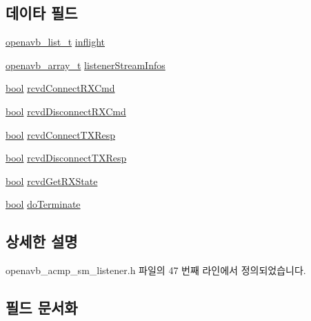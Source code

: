 \subsection*{데이타 필드}
\begin{DoxyCompactItemize}
\item 
\hyperlink{openavb__list_8h_a4bebe3a638fd3dc94da5912774a18cfe}{openavb\+\_\+list\+\_\+t} \hyperlink{structopenavb__acmp__sm__listener__vars__t_a8757a9f120141662b8b4c8b44c502c3c}{inflight}
\item 
\hyperlink{openavb__array_8h_a43e0de981c90a3d7c9ddeb67fbf2a54e}{openavb\+\_\+array\+\_\+t} \hyperlink{structopenavb__acmp__sm__listener__vars__t_ad24c4bf9e1e8f12f704194899b9555b0}{listener\+Stream\+Infos}
\item 
\hyperlink{avb__gptp_8h_af6a258d8f3ee5206d682d799316314b1}{bool} \hyperlink{structopenavb__acmp__sm__listener__vars__t_af9d28606e8d8a675efcd7519ada1a356}{rcvd\+Connect\+R\+X\+Cmd}
\item 
\hyperlink{avb__gptp_8h_af6a258d8f3ee5206d682d799316314b1}{bool} \hyperlink{structopenavb__acmp__sm__listener__vars__t_a6e45c0c8c9f8e23414d448e4c1432670}{rcvd\+Disconnect\+R\+X\+Cmd}
\item 
\hyperlink{avb__gptp_8h_af6a258d8f3ee5206d682d799316314b1}{bool} \hyperlink{structopenavb__acmp__sm__listener__vars__t_a7b91d3f570065af695eb6383a5674913}{rcvd\+Connect\+T\+X\+Resp}
\item 
\hyperlink{avb__gptp_8h_af6a258d8f3ee5206d682d799316314b1}{bool} \hyperlink{structopenavb__acmp__sm__listener__vars__t_a4bf7e0fee4c54313be69ab20a00febc2}{rcvd\+Disconnect\+T\+X\+Resp}
\item 
\hyperlink{avb__gptp_8h_af6a258d8f3ee5206d682d799316314b1}{bool} \hyperlink{structopenavb__acmp__sm__listener__vars__t_af56e1d20679599f0ae07e62ef34648a2}{rcvd\+Get\+R\+X\+State}
\item 
\hyperlink{avb__gptp_8h_af6a258d8f3ee5206d682d799316314b1}{bool} \hyperlink{structopenavb__acmp__sm__listener__vars__t_a5fc548cdb095393450f28eab966a626f}{do\+Terminate}
\end{DoxyCompactItemize}


\subsection{상세한 설명}


openavb\+\_\+acmp\+\_\+sm\+\_\+listener.\+h 파일의 47 번째 라인에서 정의되었습니다.



\subsection{필드 문서화}

